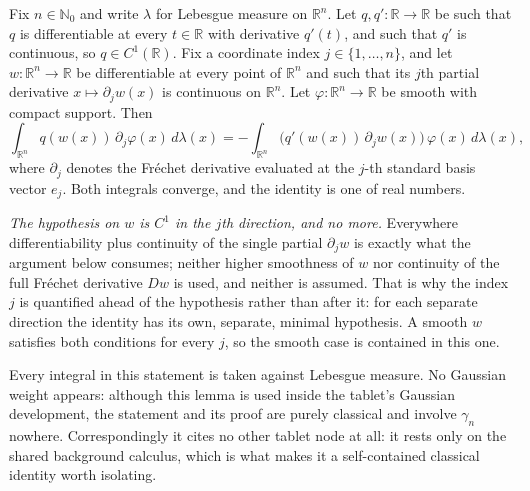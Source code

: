 \begin{lemma}
Fix $n \in \mathbb{N}_0$ and write $\lambda$ for Lebesgue measure on
$\mathbb{R}^n$.  Let $q, q' : \mathbb{R} \to \mathbb{R}$ be such that $q$ is
differentiable at every $t \in \mathbb{R}$ with derivative $q'(t)$, and such
that $q'$ is continuous, so $q \in C^1(\mathbb{R})$.  Fix a coordinate index
$j \in \{1,\ldots,n\}$, and let $w : \mathbb{R}^n \to \mathbb{R}$ be
differentiable at every point of $\mathbb{R}^n$ and such that its $j$th partial
derivative $x \mapsto \partial_j w(x)$ is continuous on $\mathbb{R}^n$.  Let
$\varphi : \mathbb{R}^n \to \mathbb{R}$ be smooth with compact support.  Then
\[
  \int_{\mathbb{R}^n} q(w(x))\, \partial_j \varphi(x)\, d\lambda(x)
    = -\int_{\mathbb{R}^n}
        \bigl(q'(w(x))\, \partial_j w(x)\bigr)\, \varphi(x)\, d\lambda(x),
\]
where $\partial_j$ denotes the Fr\'echet derivative evaluated at the $j$-th
standard basis vector $e_j$.  Both integrals converge, and the identity is one
of real numbers.

\emph{The hypothesis on $w$ is $C^1$ in the $j$th direction, and no more.}
Everywhere differentiability plus continuity of the single partial
$\partial_j w$ is exactly what the argument below consumes; neither higher
smoothness of $w$ nor continuity of the full Fr\'echet derivative $Dw$ is used,
and neither is assumed.  That is why the index $j$ is quantified ahead of the
hypothesis rather than after it: for each separate direction the identity has
its own, separate, minimal hypothesis.  A smooth $w$ satisfies both conditions
for every $j$, so the smooth case is contained in this one.

Every integral in this statement is taken against Lebesgue measure.  No Gaussian
weight appears: although this lemma is used inside the tablet's Gaussian
development, the statement and its proof are purely classical and involve
$\gamma_n$ nowhere.  Correspondingly it cites no other tablet node at all: it
rests only on the shared background calculus, which is what makes it a
self-contained classical identity worth isolating.
\end{lemma}
